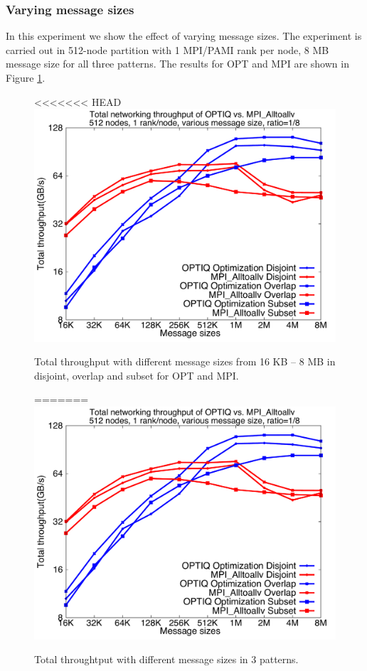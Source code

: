 \subsubsection{Varying message sizes}

In this experiment we show the effect of varying message sizes. The experiment is carried out in 512-node partition with 1 MPI/PAMI rank per node, 8 MB message size for all three patterns. The results for OPT and MPI are shown in Figure \ref{fig:messagesize}.
\begin{figure}[!htb]
\vspace{-0.15in}
\centering
<<<<<<< HEAD
\includegraphics[scale=0.30]{figures/messagesize.pdf}
\vspace{-0.1in}
\caption{Total throughput with different message sizes from 16 KB -- 8 MB in disjoint, overlap and subset for OPT and MPI.}
\vspace{-0.1in}
=======
\includegraphics[scale=0.27]{figures/messagesize.pdf}
\vspace{-0.15in}
\caption{Total throughtput with different message sizes in 3 patterns.}
\vspace{-0.15in}
\label{fig:messagesize}
\end{figure}
